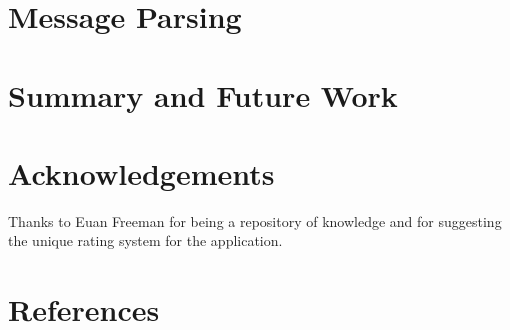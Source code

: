 \documentclass{sig-alt-release2}
\begin{document}
\section{Message Parsing}
\section{Summary and Future Work}
\section{Acknowledgements}

Thanks to Euan Freeman for being a repository of knowledge and for
suggesting the unique rating system for the application.

\section{References}
\end{document}
